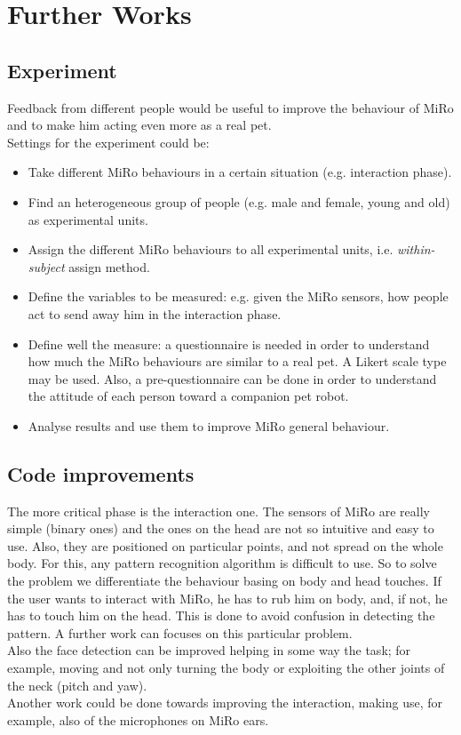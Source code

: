 \documentclass[12pt,peerreviewca, a4paper, onecolumn]{article}
\begin{document}
	\section{Further Works}
	\subsection{Experiment}
	Feedback from different people would be useful to improve the behaviour of MiRo and to make him acting even more as a real pet.\\
	Settings for the experiment could be:
	\begin{itemize}
		\item Take different MiRo behaviours in a certain situation (e.g. interaction phase).
		\vspace{-6px}
		\item Find an heterogeneous group of people (e.g. male and female, young and old) as experimental units.
		\vspace{-6px}
		\item Assign the different MiRo behaviours to all experimental units, i.e. \textit{within-subject} assign method.
		\vspace{-18px}
		\item Define the variables to be measured: e.g. given the MiRo sensors, how people act to send away him in the interaction phase.
		\vspace{-6px}
		\item Define well the measure: a questionnaire is needed in order to understand how much the MiRo behaviours are similar to a real pet. A Likert scale type may be used. Also, a pre-questionnaire can be done in order to understand the attitude of each person toward a companion pet robot.
		\vspace{-6px}
		\item Analyse results and use them to improve MiRo general behaviour.
	\end{itemize}
	
	
	
	\subsection{Code improvements}
	The more critical phase is the interaction one. The sensors of MiRo are really simple (binary ones) and the ones on the head are not so intuitive and easy to use. Also, they are positioned on particular points, and not spread on the whole body. For this, any pattern recognition algorithm is difficult to use. So to solve the problem we differentiate the behaviour basing on body and head touches. If the user wants to interact with MiRo, he has to rub him on body, and, if not, he has to touch him on the head. This is done to avoid confusion in detecting the pattern. A further work can focuses on this particular problem.\\
	Also the face detection can be improved helping in some way the task; for example, moving and not only turning the body or exploiting the other joints of the neck (pitch and yaw).\\
	Another work could be done towards improving the interaction, making use, for example, also of the microphones on MiRo ears.
 
	 
		

	
\end{document}
